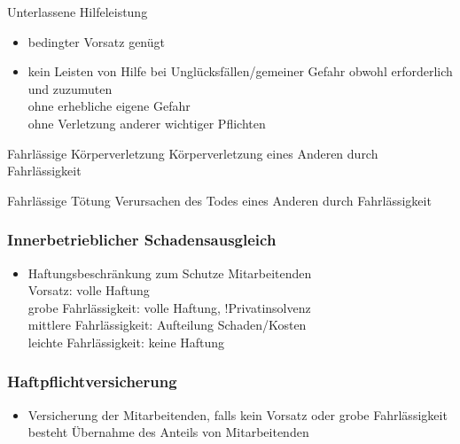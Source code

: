 \begin{hintbox}{Unterlassene Hilfeleistung}
    \begin{itemize}
        \item bedingter Vorsatz genügt
        \item kein Leisten von Hilfe bei Unglücksfällen/gemeiner Gefahr obwohl erforderlich und zuzumuten\\
        \ra ohne erhebliche eigene Gefahr\\
        \ra ohne Verletzung anderer wichtiger Pflichten
    \end{itemize}
\end{hintbox}
\begin{hintbox}{Fahrlässige Körperverletzung}
    Körperverletzung eines Anderen durch Fahrlässigkeit
\end{hintbox}
\begin{hintbox}{Fahrlässige Tötung}
    Verursachen des Todes eines Anderen durch Fahrlässigkeit
\end{hintbox}
\begin{normbox}{\subsubsection{Innerbetrieblicher Schadensausgleich}}
    \begin{itemize}
        \item Haftungsbeschränkung zum Schutze Mitarbeitenden\\
        \ra Vorsatz: volle Haftung\\
        \ra grobe Fahrlässigkeit:  volle Haftung, !Privatinsolvenz\\
        \ra mittlere Fahrlässigkeit: Aufteilung Schaden/Kosten\\
        \ra leichte Fahrlässigkeit: keine Haftung
    \end{itemize}
\end{normbox}
\begin{normbox}{\subsubsection{Haftpflichtversicherung}}
    \begin{itemize}
        \item Versicherung der Mitarbeitenden, falls kein Vorsatz oder grobe Fahrlässigkeit besteht
        \ra Übernahme des Anteils von Mitarbeitenden
    \end{itemize}
\end{normbox}
